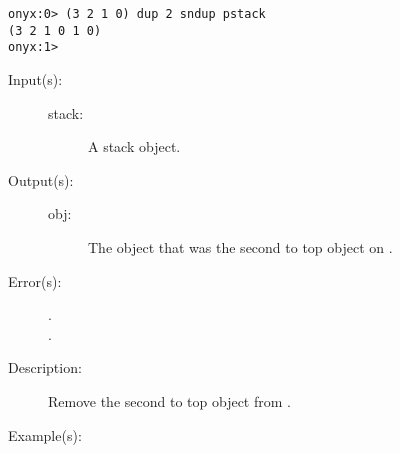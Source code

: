 \begin{description}
\begin{description}
\begin{verbatim}
onyx:0> (3 2 1 0) dup 2 sndup pstack
(3 2 1 0 1 0)
onyx:1>
		\end{verbatim}
	\end{description}
\label{systemdict:snip}
\item[{\onyxop{stack}{snip}{obj}}: ]
	\begin{description}\item[]
	\item[Input(s): ]
		\begin{description}\item[]
		\item[stack: ]
			A stack object.
		\end{description}
	\item[Output(s): ]
		\begin{description}\item[]
		\item[obj: ]
			The object that was the second to top object on
			.
		\end{description}
	\item[Error(s): ]
		\begin{description}\item[]
		\item[.]
		\item[.]
		\end{description}
	\item[Description: ]
		Remove the second to top object from .
	\item[Example(s): ]\begin{verbatim}


\end{verbatim}
\end{description}
\end{description}
